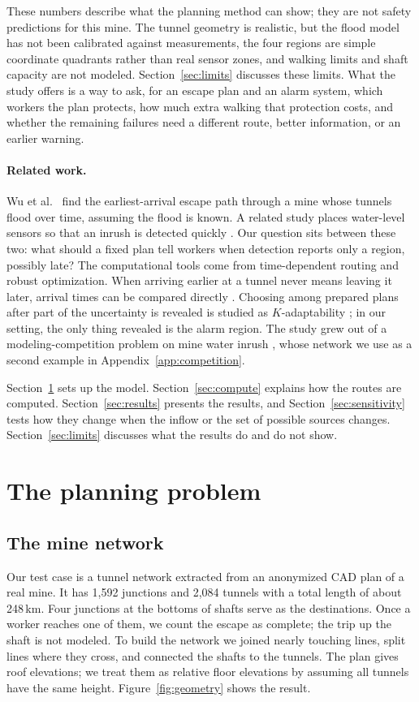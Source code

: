 \documentclass[11pt,a4paper]{article}
\begin{document}
These numbers describe what the planning method can show; they are not safety predictions for this mine. The tunnel geometry is realistic, but the flood model has not been calibrated against measurements, the four regions are simple coordinate quadrants rather than real sensor zones, and walking limits and shaft capacity are not modeled. Section~\ref{sec:limits} discusses these limits. What the study offers is a way to ask, for an escape plan and an alarm system, which workers the plan protects, how much extra walking that protection costs, and whether the remaining failures need a different route, better information, or an earlier warning.

\paragraph{Related work.}
Wu et al.\ \cite{wu2020} find the earliest-arrival escape path through a mine whose tunnels flood over time, assuming the flood is known. A related study places water-level sensors so that an inrush is detected quickly \cite{wu2021}. Our question sits between these two: what should a fixed plan tell workers when detection reports only a region, possibly late? The computational tools come from time-dependent routing and robust optimization. When arriving earlier at a tunnel never means leaving it later, arrival times can be compared directly \cite{kaufman,orda}. Choosing among prepared plans after part of the uncertainty is revealed is studied as $K$-adaptability \cite{hanasusanto}; in our setting, the only thing revealed is the alarm region. The study grew out of a modeling-competition problem on mine water inrush \cite{cumcm}, whose network we use as a second example in Appendix~\ref{app:competition}.

Section~\ref{sec:setup} sets up the model. Section~\ref{sec:compute} explains how the routes are computed. Section~\ref{sec:results} presents the results, and Section~\ref{sec:sensitivity} tests how they change when the inflow or the set of possible sources changes. Section~\ref{sec:limits} discusses what the results do and do not show.

\section{The planning problem}\label{sec:setup}
\subsection{The mine network}
Our test case is a tunnel network extracted from an anonymized CAD plan of a real mine. It has 1,592 junctions and 2,084 tunnels with a total length of about 248\,km. Four junctions at the bottoms of shafts serve as the destinations. Once a worker reaches one of them, we count the escape as complete; the trip up the shaft is not modeled. To build the network we joined nearly touching lines, split lines where they cross, and connected the shafts to the tunnels. The plan gives roof elevations; we treat them as relative floor elevations by assuming all tunnels have the same height. Figure~\ref{fig:geometry} shows the result.
\end{document}
